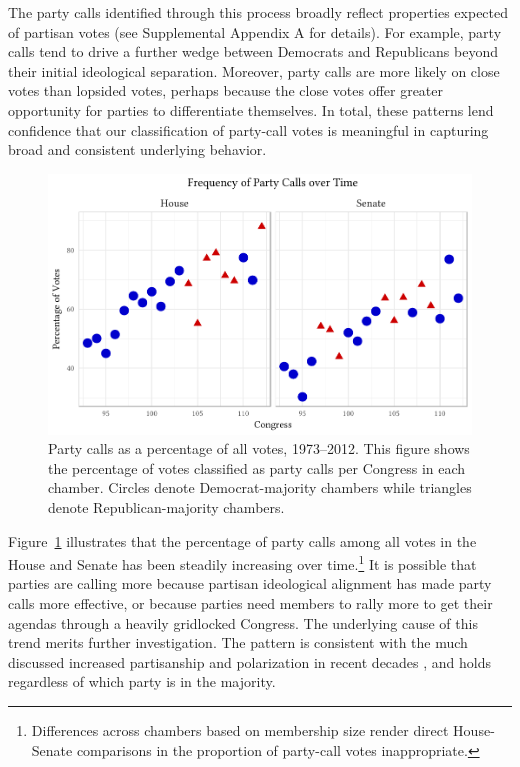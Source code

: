\documentclass[12pt]{article}
\begin{document}
The party calls identified through this process broadly reflect properties
expected of partisan votes (see Supplemental Appendix A for details).
For example, party calls tend to drive a further wedge between Democrats and
Republicans beyond their initial ideological separation.
Moreover, party calls are more likely on close votes than lopsided votes,
perhaps because the close votes offer greater opportunity for parties to
differentiate themselves.
In total, these patterns lend confidence that our classification of party-call
votes is meaningful in capturing broad and consistent underlying behavior.

\begin{figure}[t]
\centering
\includegraphics{party-calls-over-time}
\caption{
  Party calls as a percentage of all votes, 1973--2012.
  This figure shows the percentage of votes classified as party calls per
  Congress in each chamber.
  Circles denote Democrat-majority chambers while triangles denote
  Republican-majority chambers.
  \label{fig-party-calls-over-time}}
\end{figure}

Figure~\ref{fig-party-calls-over-time} illustrates that the percentage of party
calls among all votes in the House and Senate has been steadily increasing over
time.\footnote{
  \doublespacing\normalsize
  Differences across chambers based on membership size render
  direct House-Senate comparisons in the proportion of party-call votes
  inappropriate.}
It is possible that parties are calling more because partisan ideological
alignment has made party calls more effective, or because parties need members
to rally more to get their agendas through a heavily gridlocked Congress.
The underlying cause of this trend merits further investigation.
The pattern is consistent with the much discussed increased partisanship and
polarization in recent decades \citep[e.g.,][]{Aldrich:2000, Lee:2009, Lee:2016,
Theriault:2013, Smith:2014}, and holds regardless of which party is in the
majority.
\end{document}
